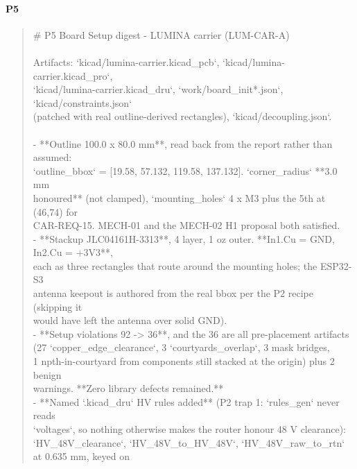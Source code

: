 \documentclass[11pt,a4paper]{article}
\begin{document}
\paragraph*{P5}
\begin{quote}\small\ttfamily\raggedright
\# P5 Board Setup digest - LUMINA carrier (LUM-CAR-A)\\
~\\
Artifacts: `kicad/lumina-carrier.kicad\_pcb`, `kicad/lumina-carrier.kicad\_pro`,\\
`kicad/lumina-carrier.kicad\_dru`, `work/board\_init{*}.json`, `kicad/constraints.json`\\
(patched with real outline-derived rectangles), `kicad/decoupling.json`.\\
~\\
- {*}{*}Outline 100.0 x 80.0 mm{*}{*}, read back from the report rather than assumed:\\
  `outline\_bbox` = {[}19.58, 57.132, 119.58, 137.132{]}. `corner\_radius` {*}{*}3.0 mm\\
  honoured{*}{*} (not clamped), `mounting\_holes` 4 x M3 plus the 5th at (46,74) for\\
  CAR-REQ-15. MECH-01 and the MECH-02 H1 proposal both satisfied.\\
- {*}{*}Stackup JLC04161H-3313{*}{*}, 4 layer, 1 oz outer. {*}{*}In1.Cu = GND, In2.Cu = +3V3{*}{*},\\
  each as three rectangles that route around the mounting holes; the ESP32-S3\\
  antenna keepout is authored from the real bbox per the P2 recipe (skipping it\\
  would have left the antenna over solid GND).\\
- {*}{*}Setup violations 92 -\textgreater{} 36{*}{*}, and the 36 are all pre-placement artifacts\\
  (27 `copper\_edge\_clearance`, 3 `courtyards\_overlap`, 3 mask bridges,\\
  1 npth-in-courtyard from components still stacked at the origin) plus 2 benign\\
  warnings. {*}{*}Zero library defects remained.{*}{*}\\
- {*}{*}Named `.kicad\_dru` HV rules added{*}{*} (P2 trap 1: `rules\_gen` never reads\\
  `voltages`, so nothing otherwise makes the router honour 48 V clearance):\\
  `HV\_48V\_clearance`, `HV\_48V\_to\_HV\_48V`, `HV\_48V\_raw\_to\_rtn` at 0.635 mm, keyed on\\

\end{quote}
\end{document}
